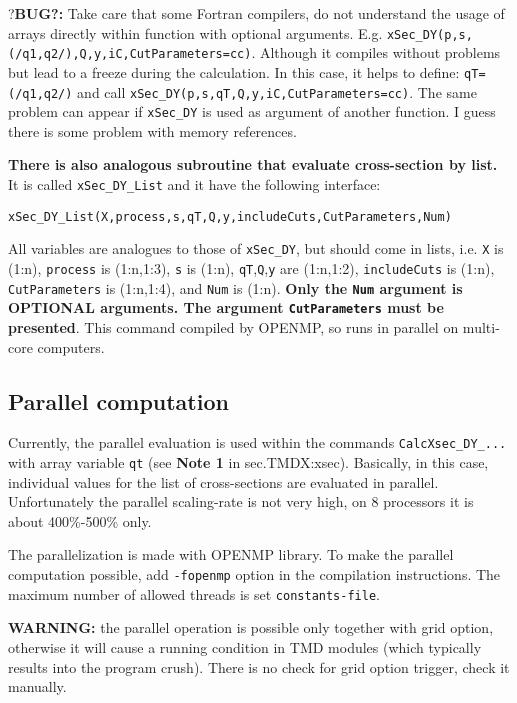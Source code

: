 \documentclass[prd,nofootinbib,eqsecnum,final]{revtex4}
\renewcommand{\(}{\left(}
\renewcommand{\)}{\right)}
\renewcommand{\[}{\left[}
\renewcommand{\]}{\right]}
\newcommand{\red}[1]{{\color[rgb]{1,0,0} #1}}
\newcommand{\blue}[1]{{\color{blue} #1}}
\begin{document}
\red{?\textbf{BUG?:}} Take care that some Fortran compilers, do not understand the usage of arrays directly within function with optional arguments. E.g. \texttt{xSec\_DY(p,s,(/q1,q2/),Q,y,iC,CutParameters=cc)}. Although it compiles without problems but lead to a freeze during the calculation. In this case, it helps to define: \texttt{qT=(/q1,q2/)} and call \texttt{xSec\_DY(p,s,qT,Q,y,iC,CutParameters=cc)}. The same problem can appear if \texttt{xSec\_DY} is used as argument of another function. I guess there is some problem with memory references.

\begin{tcolorbox}
\textbf{\blue{There is also analogous subroutine that evaluate cross-section by list.}} It is called \texttt{xSec\_DY\_List} and it have the following interface:

\begin{center}
\texttt{xSec\_DY\_List(X,process,s,qT,Q,y,includeCuts,CutParameters,Num)}
\end{center}
All variables are analogues to those of \texttt{xSec\_DY}, but should come in lists, i.e. \texttt{X} is (1:n), \texttt{process} is (1:n,1:3), \texttt{s} is (1:n), \texttt{qT},\texttt{Q},\texttt{y} are (1:n,1:2), \texttt{includeCuts} is (1:n), \texttt{CutParameters} is (1:n,1:4), and \texttt{Num} is (1:n). \textbf{Only the \texttt{Num} argument is OPTIONAL arguments. The argument \texttt{CutParameters} must be presented}. This command compiled by OPENMP, so runs in parallel on multi-core computers.
\end{tcolorbox}

\subsection{Parallel computation}

Currently, the parallel evaluation is used within the commands \texttt{CalcXsec{\_}DY{\_}...} with \blue{array variable \texttt{qt}} (see \textbf{Note 1} in sec.{TMDX:xsec}). Basically, in this case, individual values for the list of cross-sections are evaluated in parallel. Unfortunately the parallel scaling-rate is not very high, on 8 processors it is about 400\%-500\% only.

The parallelization is made with OPENMP library. To make the parallel computation possible, add \texttt{-fopenmp} option in the compilation instructions. The maximum number of allowed threads is set \texttt{constants-file}.

\begin{tcolorbox}
\red{\textbf{WARNING:}} the parallel operation is possible only together with grid option, otherwise it will cause a running condition in TMD modules (which typically results into the program crush). There is no check for grid option trigger, check it manually.
\end{tcolorbox}
\end{document}
